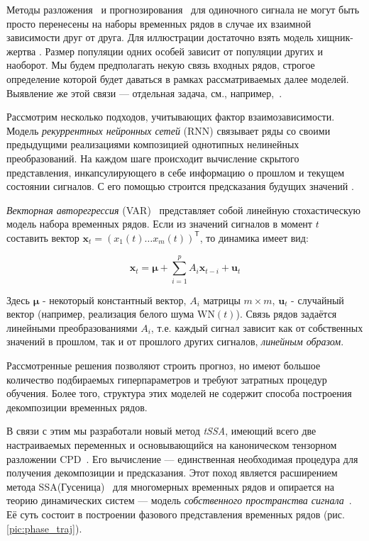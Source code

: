		Методы разложения~\cite{enders2010applied, x11, cleveland90} и прогнозирования~\cite{3b1355aedd1041f1853e609a410576f3, enders2010applied, Box_Jenkins_methodology} для одиночного сигнала не могут быть просто перенесены на наборы временных рядов в случае их взаимной зависимости друг от друга. Для иллюстрации достаточно взять модель хищник-жертва \cite{Volterra:1928}. Размер популяции одних особей зависит от популяции других и наоборот. Мы будем предполагать некую связь входных рядов, строгое определение которой будет даваться в рамках рассматриваемых далее моделей. Выявление же этой связи --- отдельная задача, см., например,~\cite{702ab909-8cb1-3c30-a5f1-ab4517d6cf1c, 2012Sci...338..496S}.
		
		Рассмотрим несколько подходов, учитывающих фактор взаимозависимости. Модель \textit{рекуррентных нейронных сетей} (RNN) \cite{neco, TEALAB2018334} связывает ряды со своими предыдущими реализациями композицией однотипных нелинейных преобразований. На каждом шаге происходит вычисление скрытого представления, инкапсулирующего в себе информацию о прошлом и текущем состоянии сигналов. С его помощью строится предсказания будущих значений \cite{ZHANG2023143, HEWAMALAGE2021388}. 
		
		\textit{Векторная авторегрессия} (VAR)~\cite{VAR_model1, doi:10.1080/01621459.1962.10480664} представляет собой линейную стохастическую модель набора временных рядов. Если из значений сигналов в момент $ t $ составить вектор $ \mathbf{x}_t = (x_1(t) \ldots x_m(t))^{\mathsf{T}} $, то динамика имеет вид:
		
		\begin{equation*}
			\mathbf{x}_t = \boldsymbol{\mu} + \sum\limits_{i = 1}^p A_i \mathbf{x}_{t - i} + \mathbf{u}_t
		\end{equation*}
		
		Здесь $ \boldsymbol{\mu} $ - некоторый константный вектор, $ A_i $ матрицы $ m \times m $, $ \mathbf{u}_t $ - случайный вектор (например, реализация белого шума $ \text{WN}(t) $). Связь рядов задаётся линейными преобразованиями $ A_i $, т.е. каждый сигнал зависит как от собственных значений в прошлом, так и от прошлого других сигналов, \textit{линейным образом}. 	
		
		Рассмотренные решения позволяют строить прогноз, но имеют большое количество подбираемых гиперпараметров и требуют затратных процедур обучения. Более того, структура этих моделей не содержит способа построения декомпозиции временных рядов. 
		
		В связи с этим мы разработали новый метод \emph{tSSA}, имеющий всего две настраиваемых переменных и основывающийся на каноническом тензорном разложении CPD~\cite{kolda_tensors}. Его вычисление --- единственная необходимая процедура для получения декомпозиции и предсказания. Этот поход является расширением метода SSA(Гусеница)~\cite{ecfb9dc578be43ae9ee8fc88b8ff9151} для многомерных временных рядов и опирается на теорию динамических систем --- модель \textit{собственного пространства сигнала}~\cite{1572261550523548160}. Её суть состоит в построении фазового представления временных рядов (рис.\ref{pic:phase_traj}). 
		
